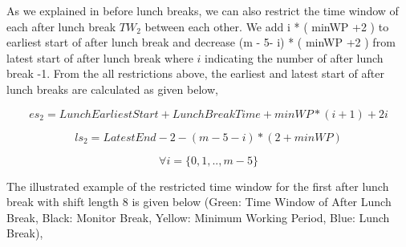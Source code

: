 \begin{itemize}
\begin{itemize}
\end{itemize}

As we explained in before lunch breaks, we can also restrict the time window of each after lunch break $TW_2$ between each other. We add i * ( minWP +2 ) to earliest start of after lunch break and decrease  (m - 5- i) * ( minWP +2 ) from latest start of after lunch break where $i$ indicating the number of after lunch break -1. From the all restrictions above, the earliest and latest start of after lunch breaks are calculated as given below,

\begin{equation}
es_2 = Lunch Earliest Start + Lunch Break Time + minWP * ( i +1) +2 i  
\end{equation}

\begin{equation}
ls_2 = Latest End - 2 - (m - 5 -  i) *  (2 +  minWP)  
\end{equation}

\begin{equation}
\forall i = \{0,1, .. , m-5\}
\end{equation}


The illustrated example of the restricted time window for the first after lunch break with shift length 8 is given below (Green: Time Window of After Lunch Break, Black: Monitor Break, Yellow: Minimum Working Period, Blue: Lunch Break), \\

\end{itemize}
